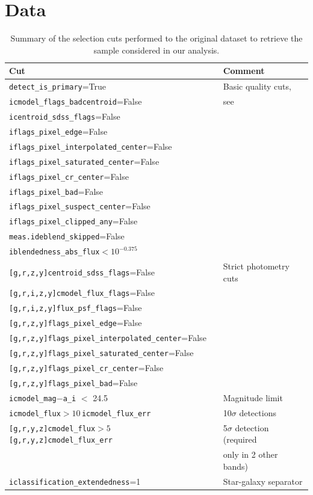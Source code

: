 \documentclass[a4paper,11pt]{article}
\begin{document}
\section{Data}\label{sec:data}
  \begin{table}
  \centering
  \begin{tabular}{|l|l|}
  \hline
   {\bf Cut} & {\bf Comment} \\
   \hline
   \texttt{detect\_is\_primary}=True & Basic quality cuts, \\
   \texttt{icmodel\_flags\_badcentroid}=False & see \cite{2018PASJ...70S..25M,2018PASJ...70S...5B}\\
   \texttt{icentroid\_sdss\_flags}=False & \\
   \texttt{iflags\_pixel\_edge}=False & \\
   \texttt{iflags\_pixel\_interpolated\_center}=False & \\
   \texttt{iflags\_pixel\_saturated\_center}=False & \\
   \texttt{iflags\_pixel\_cr\_center}=False & \\
   \texttt{iflags\_pixel\_bad}=False & \\
   \texttt{iflags\_pixel\_suspect\_center}=False & \\
   \texttt{iflags\_pixel\_clipped\_any}=False & \\
   \texttt{meas.ideblend\_skipped}=False & \\
   \texttt{iblendedness\_abs\_flux}$<10^{-0.375}$ & \\
   \hline %
   \texttt{[g,r,z,y]centroid\_sdss\_flags}=False & Strict photometry cuts\\
   \texttt{[g,r,i,z,y]cmodel\_flux\_flags}=False & \\
   \texttt{[g,r,i,z,y]flux\_psf\_flags}=False & \\
   \texttt{[g,r,z,y]flags\_pixel\_edge}=False & \\
   \texttt{[g,r,z,y]flags\_pixel\_interpolated\_center}=False & \\
   \texttt{[g,r,z,y]flags\_pixel\_saturated\_center}=False & \\
   \texttt{[g,r,z,y]flags\_pixel\_cr\_center}=False & \\
   \texttt{[g,r,z,y]flags\_pixel\_bad}=False & \\
   \hline
   \texttt{icmodel\_mag}$-$\texttt{a\_i} $<$ 24.5 & Magnitude limit\\ %
   \hline
   \texttt{icmodel\_flux}$>10\,$\texttt{icmodel\_flux\_err} & 10$\sigma$ detections\\
   \hline
   \texttt{[g,r,y,z]cmodel\_flux}$>5\,$\texttt{[g,r,y,z]cmodel\_flux\_err} & 5$\sigma$ detection  (required \\
   & only in 2 other bands)\\
   \hline
   \texttt{iclassification\_extendedness}=1 & Star-galaxy separator\\
   \hline
  \end{tabular}
  \caption{Summary of the selection cuts performed to the original dataset to retrieve the sample considered in our analysis.} \label{tab:cuts_summary}
  \end{table}  
\end{document}
